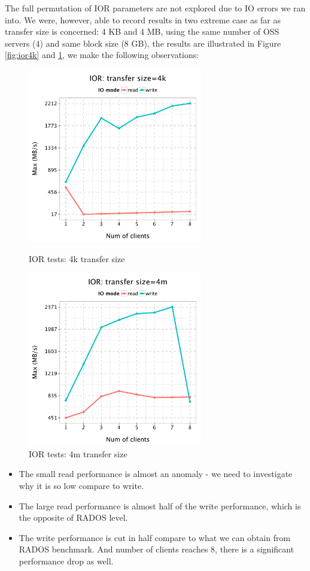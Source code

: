 \documentclass{article}
\begin{document}
The full permutation of IOR parameters are not explored due to IO errors we ran
into. We were, however, able to record results in two extreme case as far as
transfer size is concerned: 4 KB and 4 MB, using the same number of OSS servers
(4) and same block size (8 GB), the results are illustrated in Figure
\ref{fig:ior4k} and \ref{fig:ior4m}, we make the following observations:


\begin{figure}[H]
\centering
\begin{minipage}[t]{0.5\linewidth}
\centering
\includegraphics[width=3in]{data/ior_4k}
\caption{IOR tests: 4k transfer size}
\label{fig:ior4k}
\end{minipage}%
\begin{minipage}[t]{0.5\linewidth}
\centering
\includegraphics[width=3in]{data/ior_4m}
\caption{IOR tests: 4m transfer size}
\label{fig:ior4m}
\end{minipage}%
\end{figure}


\begin{itemize}
  \item The small read performance is almost an anomaly - we need to
  investigate why it is so low compare to write.
  \item The large read performance is almost half of the write performance,
  which is the opposite of RADOS level. 
  \item The write performance is cut in half compare to what we can obtain from
  RADOS benchmark. And number of clients reaches 8, there is a significant
  performance drop as well. 
\end{itemize}
\end{document}
